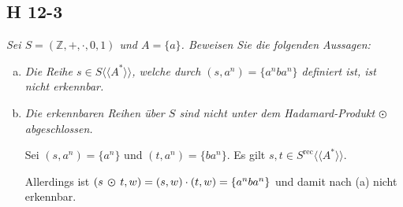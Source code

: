 \documentclass{scrartcl}
\begin{document}
\subsection{H 12-3}

\textsl{Sei $S = (\mathbb{Z}, +, \cdot, 0, 1)$ und $A = \{a\}$. Beweisen Sie die folgenden Aussagen:}

\begin{enumerate}[(a)]
    \item \textsl{Die Reihe $s \in S\langle\langle A^* \rangle\rangle$, welche durch $(s, a^n) = \{a^nba^n\}$ definiert ist, ist nicht erkennbar.}

    \item \textsl{Die erkennbaren Reihen über $S$ sind nicht unter dem Hadamard-Produkt $\varodot$ abgeschlossen.}

      Sei $(s, a^n) = \{a^n\}$ und $(t, a^n) = \{ba^n\}$. Es gilt $s, t \in S^{\text{rec}}\langle\langle A^* \rangle\rangle$.

      Allerdings ist $(s\,\varodot\,t, w) = (s, w) \cdot (t, w) = \{a^nba^n\}$ und damit nach (a) nicht erkennbar.
\end{enumerate}
\end{document}
